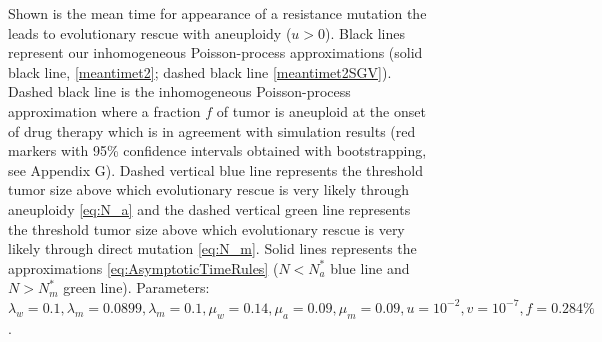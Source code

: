 \documentclass[12pt]{extarticle}
\begin{document}
\begin{appendices}
\begin{figure}
\caption{Shown is the mean time for appearance of a resistance mutation the leads to evolutionary rescue with aneuploidy ($u>0$). Black lines represent our inhomogeneous Poisson-process approximations (solid black line, \cref{meantimet2}; dashed black line \cref{meantimet2SGV}). Dashed black line is the  inhomogeneous Poisson-process approximation where a fraction $f$ of tumor is aneuploid at the onset of drug therapy which is in agreement with simulation results (red markers with 95\% confidence intervals obtained with bootstrapping, see Appendix G). Dashed vertical blue line represents the threshold tumor size above which evolutionary rescue is very likely through aneuploidy \cref{eq:N_a} and the dashed vertical green line represents the threshold tumor size above which evolutionary rescue is very likely through direct mutation \cref{eq:N_m}. Solid lines represents the approximations \cref{eq:AsymptoticTimeRules} ($N<N_a^*$ blue line and $N>N_m^*$ green line). 
Parameters: $\lambda_w=0.1,\lambda_m=0.0899,\lambda_m=0.1,\mu_w=0.14,\mu_a=0.09,\mu_m=0.09, u=10^{-2}, v=10^{-7},f=0.284\%$.}
\label{SGVEvolutionaryRescueTimeComplete}
\end{figure}
\end{appendices}
\end{document}

